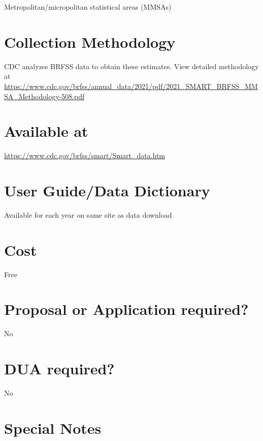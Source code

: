 \documentclass[
]{book}
\begin{document}
Metropolitan/micropolitan statistical areas (MMSAs)

\hypertarget{collection-methodology-77}{%
\section{Collection Methodology}\label{collection-methodology-77}}

CDC analyzes BRFSS data to obtain these estimates. View detailed methodology at \url{https://www.cdc.gov/brfss/annual_data/2021/pdf/2021_SMART_BRFSS_MMSA_Methodology-508.pdf}

\hypertarget{available-at-77}{%
\section{Available at}\label{available-at-77}}

\url{https://www.cdc.gov/brfss/smart/Smart_data.htm}

\hypertarget{user-guidedata-dictionary-77}{%
\section{User Guide/Data Dictionary}\label{user-guidedata-dictionary-77}}

Available for each year on same site as data download

\hypertarget{cost-77}{%
\section{Cost}\label{cost-77}}

Free

\hypertarget{proposal-or-application-required-77}{%
\section{Proposal or Application required?}\label{proposal-or-application-required-77}}

No

\hypertarget{dua-required-77}{%
\section{DUA required?}\label{dua-required-77}}

No

\hypertarget{special-notes-77}{%
\section{Special Notes}\label{special-notes-77}}
\end{document}
